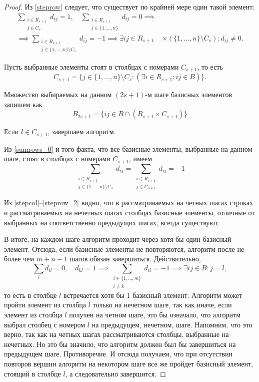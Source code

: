 \documentclass[12pt]{article}
\theoremstyle{definition}
\theoremstyle{plain}
\theoremstyle{definition}
\begin{document}
\begin{proof}
Из \eqref{steprow} следует, что существует по крайней мере один такой элемент:
\begin{equation}\label{sumrows_0}
\begin{aligned}
\sum_{\substack{i \in R_{s+1} \\ j \in C_s}} d_{ij} = 1, \quad
\sum_{\substack{i \in R_{s+1} \\ j \in \{1,\dots,n\}}} d_{ij} = 0 \implies &\\
\implies
\sum_{\substack{i \in R_{s+1} \\ j \in \{1,\dots,n\} \setminus C_s}} d_{ij} = -1
\implies \exists ij \in R_{s+1} & \times (\{1,\dots,n\} \setminus C_s): d_{ij} \neq 0.
\end{aligned}
\end{equation}

Пусть выбранные элементы стоят в столбцах с номерами $C_{s+1}$, то есть
\[
C_{s+1} = \{j \in \{1,\dots,n\} \setminus C_s: (\exists i \in R_{s+1}: ij \in B)\}.
\]

Множество выбираемых на данном $(2s+1)$-м шаге базисных элементов запишем как
\[
B_{2s+1} = \{ij \in B \cap (R_{s+1} \times C_{s+1})\}
\]

Если $l \in C_{s+1}$, завершаем алгоритм.

Из \eqref{sumrows_0} и того факта, что все базисные элементы, выбранные на данном
шаге, стоят в столбцах с номерами $C_{s+1}$, имеем
\begin{equation}\label{steprow_2}
\sum_{\substack{i \in R_{s+1} \\ j \in \{1,\dots,n\} \setminus C_s}} d_{ij}
= \sum_{\substack{i \in R_{s+1} \\ j \in C_{s+1}}} d_{ij}
= -1
\end{equation}

Из \eqref{stepcol}--\eqref{steprow_2} видно, что в рассматриваемых на
четных шагах строках и рассматриваемых на нечетных шагах столбцах
базисные элементы, отличные от выбранных на соответственно предыдущих шагах,
всегда существуют.

В итоге, на каждом шаге алгоритм проходит через хотя бы один базисный элемент.
Отсюда, если базисные элементы не повторяются, алгоритм после не более чем
$m + n - 1$ шагов обязан завершиться. Действительно,
\[
\sum_{i} d_{il} = 0, \quad d_{kl} = 1 \implies
\sum_{\substack{i \in \{1,\dots,m\} \\ i \neq k}} d_{il} = -1 \implies \exists ij \in B: j = l,
\]
то есть в столбце $l$ встречается хотя бы 1 базисный элемент. Алгоритм может
пройти элемент из столбца $l$ только на нечетном шаге, так как иначе,
если элемент из столбца $l$ получен на четном шаге, это бы означало, что
алгоритм выбрал столбец с номером $l$ на предыдущем, нечетном, шаге. Напомним,
что это верно, так как на четных шагах рассматриваются столбцы, выбранные на нечетных.
Но это бы значило, что алгоритм должен был бы завершиться на предыдущем шаге.
Противоречие. И отсюда получаем, что при отсутствии повторов вершин алгоритм на некотором шаге
все же пройдет базисный элемент, стоящий в столбце $l$, а следовательно завершится.


\end{proof}
\end{document}
